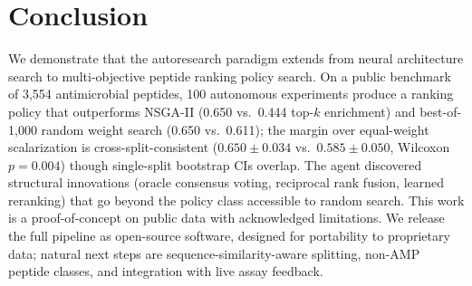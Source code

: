 \section{Conclusion}
\label{sec:conclusion}

We demonstrate that the autoresearch paradigm extends from neural architecture search to multi-objective peptide ranking policy search.
On a public benchmark of 3{,}554 antimicrobial peptides, 100 autonomous experiments produce a ranking policy that outperforms NSGA-II (0.650 vs.\ 0.444 top-$k$ enrichment) and best-of-1{,}000 random weight search (0.650 vs.\ 0.611); the margin over equal-weight scalarization is cross-split-consistent ($0.650 \pm 0.034$ vs.\ $0.585 \pm 0.050$, Wilcoxon $p = 0.004$) though single-split bootstrap CIs overlap.
The agent discovered structural innovations (oracle consensus voting, reciprocal rank fusion, learned reranking) that go beyond the policy class accessible to random search.
This work is a proof-of-concept on public data with acknowledged limitations.
We release the full pipeline as open-source software, designed for portability to proprietary data; natural next steps are sequence-similarity-aware splitting, non-AMP peptide classes, and integration with live assay feedback.
